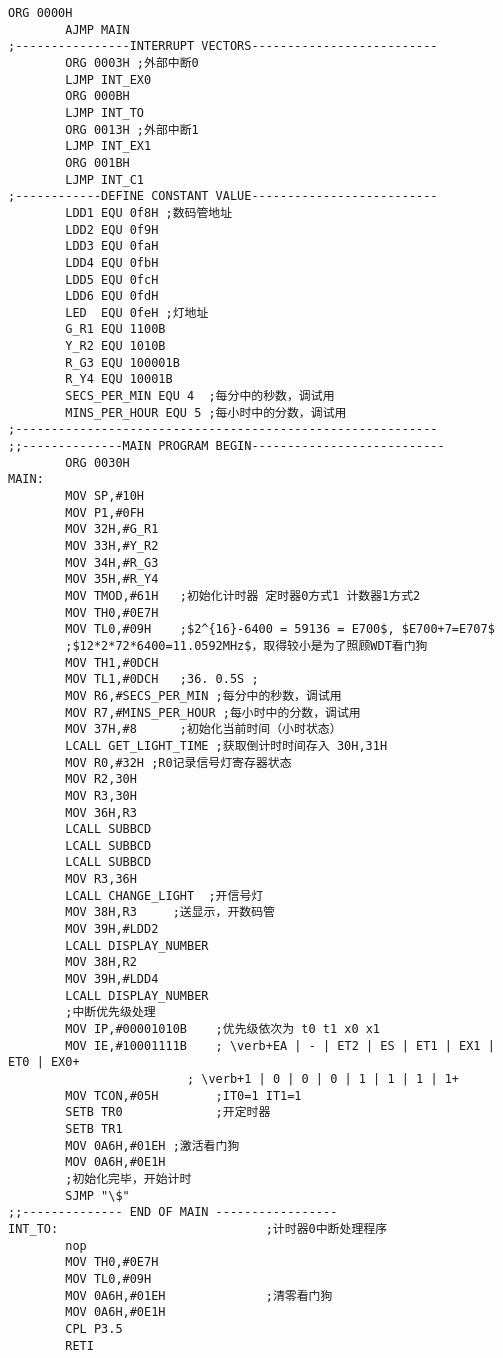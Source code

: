\begin{lstlisting}[language={[x86masm]assembler},  escapeinside=""]
		ORG 0000H
		AJMP MAIN
;----------------INTERRUPT VECTORS--------------------------
		ORG 0003H ;外部中断0
		LJMP INT_EX0
		ORG 000BH							
		LJMP INT_TO							
		ORG 0013H ;外部中断1						
		LJMP INT_EX1							
		ORG 001BH							
		LJMP INT_C1							
;------------DEFINE CONSTANT VALUE--------------------------
		LDD1 EQU 0f8H ;数码管地址
		LDD2 EQU 0f9H
		LDD3 EQU 0faH
		LDD4 EQU 0fbH
		LDD5 EQU 0fcH
		LDD6 EQU 0fdH
		LED  EQU 0feH ;灯地址
		G_R1 EQU 1100B
		Y_R2 EQU 1010B
		R_G3 EQU 100001B
		R_Y4 EQU 10001B
		SECS_PER_MIN EQU 4  ;每分中的秒数，调试用
		MINS_PER_HOUR EQU 5 ;每小时中的分数，调试用																							
;-----------------------------------------------------------	
;;--------------MAIN PROGRAM BEGIN---------------------------
		ORG 0030H				 
MAIN:	
		MOV SP,#10H
		MOV P1,#0FH
		MOV 32H,#G_R1
		MOV 33H,#Y_R2
		MOV 34H,#R_G3
		MOV 35H,#R_Y4
		MOV TMOD,#61H	;初始化计时器 定时器0方式1 计数器1方式2
		MOV TH0,#0E7H	
		MOV TL0,#09H	;$2^{16}-6400 = 59136 = E700$, $E700+7=E707$
		;$12*2*72*6400=11.0592MHz$，取得较小是为了照顾WDT看门狗
		MOV TH1,#0DCH
		MOV TL1,#0DCH	;36. 0.5S ;	
		MOV R6,#SECS_PER_MIN ;每分中的秒数，调试用
		MOV R7,#MINS_PER_HOUR ;每小时中的分数，调试用
		MOV 37H,#8		;初始化当前时间（小时状态）
		LCALL GET_LIGHT_TIME ;获取倒计时时间存入 30H,31H
		MOV R0,#32H	;R0记录信号灯寄存器状态
		MOV R2,30H
		MOV R3,30H
		MOV 36H,R3
		LCALL SUBBCD
		LCALL SUBBCD
		LCALL SUBBCD
		MOV R3,36H
		LCALL CHANGE_LIGHT	;开信号灯
		MOV 38H,R3	   ;送显示，开数码管
		MOV 39H,#LDD2
		LCALL DISPLAY_NUMBER
		MOV 38H,R2
		MOV 39H,#LDD4
		LCALL DISPLAY_NUMBER
		;中断优先级处理
		MOV IP,#00001010B	 ;优先级依次为 t0 t1 x0 x1
		MOV IE,#10001111B	 ; \verb+EA | - | ET2 | ES | ET1 | EX1 | ET0 | EX0+
						 ; \verb+1 | 0 | 0 | 0 | 1 | 1 | 1 | 1+
		MOV TCON,#05H		 ;IT0=1 IT1=1
		SETB TR0			 ;开定时器
		SETB TR1
		MOV 0A6H,#01EH ;激活看门狗
		MOV 0A6H,#0E1H 
		;初始化完毕，开始计时
		SJMP "\$"
;;-------------- END OF MAIN -----------------
INT_TO:								;计时器0中断处理程序
		nop
		MOV TH0,#0E7H 				
		MOV TL0,#09H
		MOV 0A6H,#01EH 				;清零看门狗
		MOV 0A6H,#0E1H 
		CPL P3.5
		RETI
		

\end{lstlisting}
